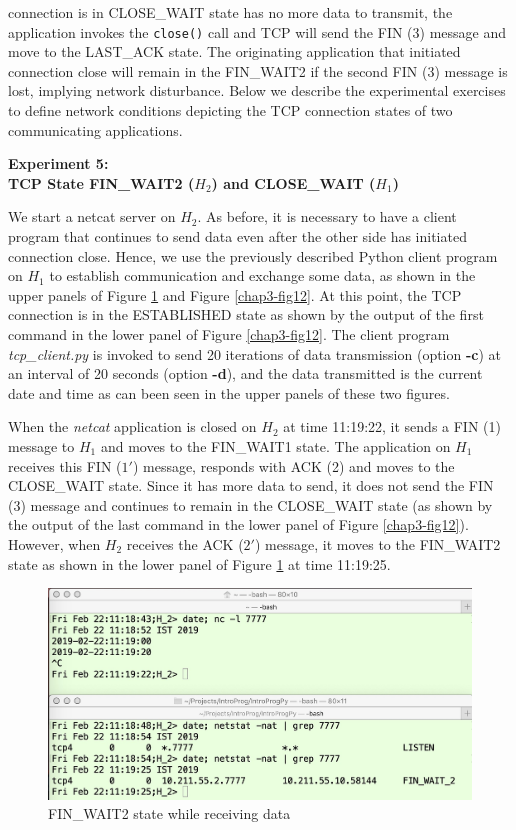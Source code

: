 \begin{multicols}{2}
\noindent
connection is in CLOSE\_WAIT state has no more data to transmit, the application invokes the \lstinline|close()| call and TCP will send the FIN (3) message and move to the LAST\_ACK state. The originating application that initiated connection close will remain in the FIN\_WAIT2 if the second FIN (3) message is lost, implying network disturbance. Below we describe the experimental exercises to define network conditions depicting the TCP connection states of two communicating applications.

\medskip
\noindent
\textbf{Experiment 5:\\ TCP State FIN\_WAIT2 (\boldmath$H_{2}$) and CLOSE\_WAIT ($H_{1}$)}
\smallskip

We start a netcat server on $H_{2}$. As before, it is necessary to have a client program that continues to send data even after the other side has initiated connection close. Hence, we use the previously described Python client program on $H_{1}$ to establish communication and exchange some data, as shown in the upper panels of Figure \ref{chap3-fig11} and Figure \ref{chap3-fig12}. At this point, the TCP connection is in the ESTABLISHED state as shown by the output of the first command in the lower panel of Figure \ref{chap3-fig12}. The client program \textit{tcp\_client.py} is invoked to send 20 iterations of data transmission (option \textbf{-c}) at an interval of 20 seconds (option \textbf{-d}), and the data transmitted is the current date and time as can been seen in the upper panels of these two figures.

When the \textit{netcat} application is closed on $H_{2}$ at time 11:19:22, it sends a FIN (1) message to $H_{1}$ and moves to the FIN\_WAIT1 state. The application on $H_{1}$ receives this FIN ($1'$) message, responds with ACK (2) and moves to the CLOSE\_WAIT state. Since it has more data to send, it does not send the FIN (3) message and continues to remain in the CLOSE\_WAIT state (as shown by the output of the last command in the lower panel of Figure \ref{chap3-fig12}). However, when $H_{2}$ receives the ACK ($2'$) message, it moves to the FIN\_WAIT2 state as shown in the lower panel of Figure \ref{chap3-fig11} at time 11:19:25.
\end{multicols}

\begin{figure}[!htb]
\centering
\includegraphics[scale=.23]{src/Figures/chap3/11.jpg}
\caption{FIN\_WAIT2 state while receiving data}\label{chap3-fig11}
\end{figure}

